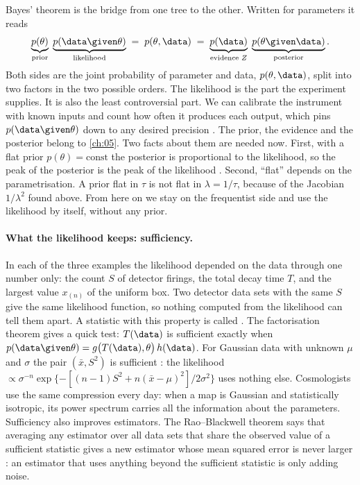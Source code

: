 Bayes' theorem is the bridge from one tree to the other. Written for
parameters it reads 
\begin{equation}
  \underbrace{p(\theta)}_{\text{prior}}\;
  \underbrace{p(\data\given\theta)}_{\text{likelihood}}
  \;=\;p(\theta,\data)\;=\;
  \underbrace{p(\data)}_{\text{evidence }Z}\;
  \underbrace{p(\theta\given\data)}_{\text{posterior}} .
  \label{3b:eq:bayes}
\end{equation}
Both sides are the joint probability of parameter and data, $p(\theta,\data)$,
split into two factors in the two possible orders. The likelihood is the
part the experiment supplies. It is also the least controversial part. We
can calibrate the instrument with known inputs and count how often it
produces each output, which pins $p(\data\given\theta)$ down to any desired
precision . The prior, the evidence and the
posterior belong to \cref{ch:05}. Two facts about them are needed now.
First, with a flat prior $p(\theta)=\text{const}$ the posterior is
proportional to the likelihood, so the peak of the posterior is the peak of
the likelihood . Second, ``flat'' depends on
the parametrisation. A prior flat in $\tau$ is not flat in $\lambda=1/\tau$,
because of the Jacobian $1/\lambda^2$ found above. From here on we stay
on the frequentist side and use the likelihood by itself, without any prior.

\paragraph{What the likelihood keeps: sufficiency.}
In each of the three examples the likelihood depended on the data through
one number only: the count $S$ of detector firings, the total decay time
$T$, and the largest value $x_{(n)}$ of the uniform box. Two detector data
sets with the same $S$ give the same likelihood function, so nothing
computed from the likelihood can tell them apart. A statistic with this
property is called 
 . The factorisation
theorem  gives a quick test: $T(\data)$ is
sufficient exactly when $p(\data\given\theta)=g\bigl(T(\data),\theta\bigr)\,h(\data)$.
For Gaussian data with unknown $\mu$ and $\sigma$ the pair
$(\bar x,S^2)$ is sufficient : the likelihood
$\propto\sigma^{-n}\exp\{-[(n-1)S^2+n(\bar x-\mu)^2]/2\sigma^2\}$ uses
nothing else. Cosmologists use the same compression every day: when a map
is Gaussian and statistically isotropic, its power spectrum carries all the
information about the parameters. Sufficiency also improves estimators. The
Rao--Blackwell
theorem says that averaging any estimator over all data sets that share
the observed value of a sufficient statistic gives a new estimator whose
mean squared error is never larger : an
estimator that uses anything beyond the sufficient statistic is only
adding noise.

